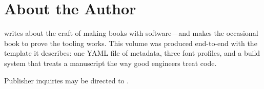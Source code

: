 \chapter{About the Author}

\noindent\BookAuthor{} writes about the craft of making books with
software---and makes the occasional book to prove the tooling works.
This volume was produced end-to-end with the template it describes:
one YAML file of metadata, three font profiles, and a build system
that treats a manuscript the way good engineers treat code.

\bigskip

\noindent Publisher inquiries may be directed to \BookPublisher.
